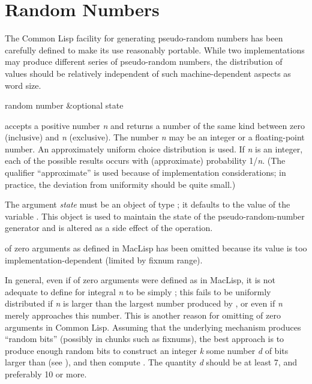 \section{Random Numbers}
\label{RANDOM}

The Common Lisp facility for generating pseudo-random numbers has
been carefully defined to make its use reasonably portable.
While two implementations may produce different series
of pseudo-random numbers, the distribution of values should
be relatively independent of such machine-dependent aspects
as word size.

\begin{defun}[Function]
random number &optional state

 accepts a positive number \emph{n} and returns
a number of the same kind between zero (inclusive) and \emph{n} (exclusive).
The number \emph{n} may be an integer or a floating-point number.
An approximately uniform choice distribution is used.
If \emph{n} is an integer, each of the possible results
occurs with (approximate) probability 1/\emph{n}.
(The qualifier ``approximate'' is used because of implementation
considerations; in practice, the deviation from uniformity should be
quite small.)

The argument \emph{state} must be an object of type ;
it defaults to the value of the variable .
This object is used to maintain the state of the pseudo-random-number
generator and is altered as a side effect of the  operation.

\beforenoterule
\begin{incompatibility}
 of zero arguments as defined in MacLisp
has been omitted because
its value is too implementation-dependent (limited by fixnum range).
\end{incompatibility}
\betweennoterule
\begin{implementation}
In general, even if  of zero arguments
were defined as in MacLisp,
it is not adequate to define  for integral \emph{n}
to be simply ; this fails to be uniformly distributed
if \emph{n} is larger than the largest number produced by ,
or even if \emph{n} merely approaches this number.
This is another reason for omitting  of zero arguments in Common Lisp.
Assuming that the underlying mechanism produces ``random bits''
(possibly in chunks such as fixnums), the best approach is to produce
enough random bits to construct an integer \emph{k} some number \emph{d} of bits
larger than  (see ), and
then compute .  The quantity \emph{d} should be at
least 7, and preferably 10 or more.


\end{implementation}
\end{defun}
